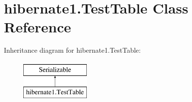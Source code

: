 \hypertarget{classhibernate1_1_1_test_table}{\section{hibernate1.\-Test\-Table Class Reference}
\label{classhibernate1_1_1_test_table}
}
Inheritance diagram for hibernate1.\-Test\-Table\-:\begin{figure}[H]
\begin{center}
\leavevmode
\includegraphics[height=2.000000cm]{classhibernate1_1_1_test_table}
\end{center}
\end{figure}
